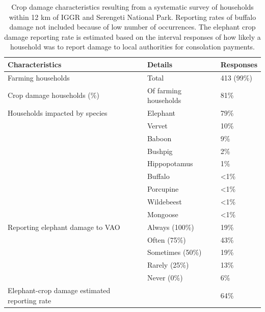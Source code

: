 \documentclass[12pt,]{article}
\begin{document}
\begin{landscape}
\begin{table}[]
\centering
\footnotesize 
\caption{Crop damage characteristics resulting from a systematic survey of households within 12 km of IGGR and Serengeti National Park. Reporting rates of buffalo damage not included because of low number of occurrences. The elephant crop damage reporting rate is estimated based on the interval responses of how likely a household was to report damage to local authorities for consolation payments.}
\begin{tabular}{lll}
\hline
\textbf{Characteristics}                      & \textbf{Details}      & \textbf{Responses} \\ \hline
Farming households                            & Total                 & 413 (99\%)         \\
Crop damage households (\%)                   & Of farming households & 81\%               \\
Households impacted by species                & Elephant              & 79\%               \\
                                              & Vervet                & 10\%               \\
                                              & Baboon                & 9\%                \\
                                              & Bushpig               & 2\%                \\
                                              & Hippopotamus          & 1\%                \\
                                              & Buffalo               & \textless 1\%      \\
                                              & Porcupine             & \textless 1\%      \\
                                              & Wildebeest            & \textless 1\%      \\
                                              & Mongoose              & \textless 1\%      \\
Reporting elephant damage to VAO              & Always (100\%)        & 19\%               \\
                                              & Often (75\%)          & 43\%               \\
                                              & Sometimes (50\%)      & 19\%               \\
                                              & Rarely (25\%)         & 13\%               \\
                                              & Never (0\%)           & 6\%                \\
Elephant-crop damage estimated reporting rate &                       & 64\%               \\ \hline
\end{tabular}

\label{tab:table1reportingrates}
\end{table}
\end{landscape}
\end{document}
